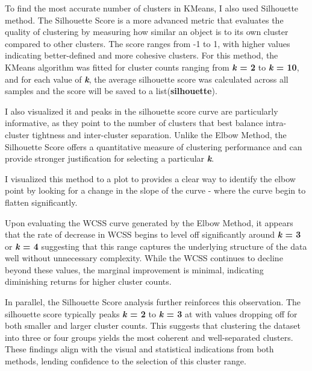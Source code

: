 \documentclass[a4paper,12pt]{article}
\begin{document}
\begin{itemize}[label= {*}, leftmargin= 1cm]
\begin{itemize}[label= {}, leftmargin= 1cm]
        To find the most accurate number of clusters in KMeans, I also used Silhouette method. The Silhouette Score is a more advanced metric that evaluates the quality of clustering by measuring how similar an object is to its own cluster compared to other clusters. The score ranges from -1 to 1, with higher values indicating better-defined and more cohesive clusters. For this method, the KMeans algorithm was fitted for cluster counts ranging from \textbf{\textit{k} = 2} to \textbf{\textit{k} = 10}, and for each value of \textbf{\textit{k}}, the average silhouette score was calculated across all samples and the score will be saved to a list(\textbf{silhouette}).
        \vspace{0.3cm}
        
        I also visualized it and peaks in the silhouette score curve are particularly informative, as they point to the number of clusters that best balance intra-cluster tightness and inter-cluster separation. Unlike the Elbow Method, the Silhouette Score offers a quantitative measure of clustering performance and can provide stronger justification for selecting a particular \textbf{\textit{k}}.
        \vspace{0.3cm}

        I visualized this method to a plot to provides a clear way to identify the elbow point by looking for a change in the slope of the curve - where the curve begin to flatten significantly.
        \vspace{0.5cm}

        Upon evaluating the WCSS curve generated by the Elbow Method, it appears that the rate of decrease in WCSS begins to level off significantly around \textbf{\textit{k} = 3} or \textbf{\textit{k} = 4} suggesting that this range captures the underlying structure of the data well without unnecessary complexity. While the WCSS continues to decline beyond these values, the marginal improvement is minimal, indicating diminishing returns for higher cluster counts.
        \vspace{0.3cm}

        In parallel, the Silhouette Score analysis further reinforces this observation. The silhouette score typically peaks \textbf{\textit{k} = 2} to \textbf{\textit{k} = 3} at with values dropping off for both smaller and larger cluster counts. This suggests that clustering the dataset into three or four groups yields the most coherent and well-separated clusters. These findings align with the visual and statistical indications from both methods, lending confidence to the selection of this cluster range.
        \vspace{0.3cm}


\end{itemize}
\end{itemize}
\end{document}
